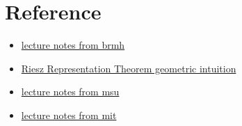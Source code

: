 \section{Reference}
\begin{itemize}
    \item \href{https://web.mat.bham.ac.uk/~malevao/MSM3P21/l15.pdf}{lecture notes from brmh}
    \item \href{https://math.stackexchange.com/questions/3699482/riesz-representation-theorem-geometric-intuition}{Riesz Representation Theorem geometric intuition}
    \item \href{https://users.math.msu.edu/users/banelson/teaching/920/chI_notes.pdf}{lecture notes from msu}
    \item \href{https://ocw.mit.edu/courses/18-102-introduction-to-functional-analysis-spring-2021/resources/mit18_102s21_lec17/}{lecture notes from mit}
\end{itemize}